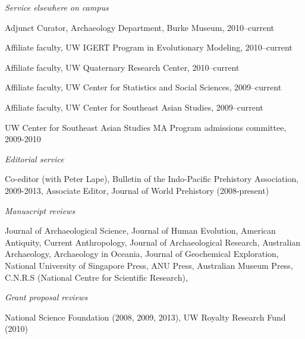 \documentclass[11pt,article,oneside]{memoir}
\begin{document}
 \vspace{0.05in}

\noindent\emph{Service elsewhere on campus\vspace{0.01in}}


\ind Adjunct Curator, Archaeology Department, Burke Museum, 2010--current

\ind Affiliate faculty, UW IGERT Program in Evolutionary Modeling, 2010--current

\ind Affiliate faculty, UW Quaternary Research Center, 2010--current

\ind Affiliate faculty, UW Center for Statistics and Social Sciences, 2009--current

\ind Affiliate faculty, UW Center for Southeast Asian Studies, 2009--current

\ind UW Center for Southeast Asian Studies MA Program admissions committee, 2009-2010

\bigskip



\medskip

\noindent\emph{Editorial service\vspace{0.01in}}

\ind Co-editor (with Peter Lape), Bulletin of the Indo-Pacific Prehistory Association, 2009-2013, Associate Editor, Journal of World Prehistory (2008-present)

 \vspace{0.05in}

\noindent\emph{Manuscript reviews\vspace{0.01in}}

\noindent Journal of Archaeological Science, Journal of Human Evolution, American Antiquity, Current Anthropology, Journal of Archaeological Research, Australian Archaeology, Archaeology in Oceania, Journal of Geochemical Exploration, National University of Singapore Press, ANU Press, Australian Museum Press, C.N.R.S (National Centre for Scientific Research),   

 \vspace{0.05in}

\noindent\emph{Grant proposal reviews\vspace{0.01in}}

\noindent National Science Foundation (2008, 2009, 2013), UW Royalty Research Fund (2010)
\end{document}
